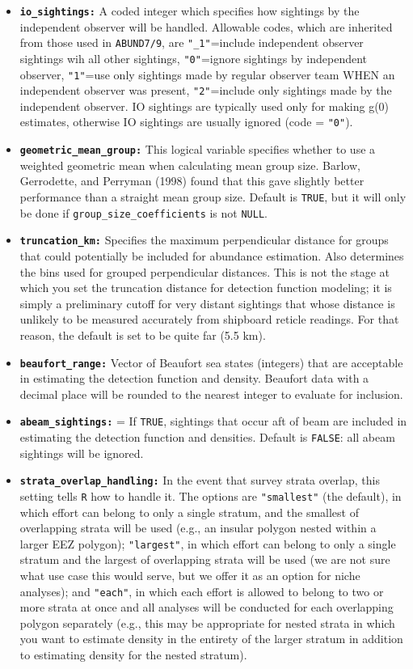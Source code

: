 \documentclass[
]{book}
\begin{document}
\begin{itemize}
\item
  \textbf{\texttt{io\_sightings:}} A coded integer which specifies how sightings by the independent observer will be handled. Allowable codes, which are inherited from those used in \texttt{ABUND7/9}, are \texttt{"\_1"}=include independent observer sightings wih all other sightings, \texttt{"0"}=ignore sightings by independent observer, \texttt{"1"}=use only sightings made by regular observer team WHEN an independent observer was present, \texttt{"2"}=include only sightings made by the independent observer. IO sightings are typically used only for making g(0) estimates, otherwise IO sightings are usually ignored (code = \texttt{"0"}).
\item
  \textbf{\texttt{geometric\_mean\_group:}} This logical variable specifies whether to use a weighted geometric mean when calculating mean group size. Barlow, Gerrodette, and Perryman (1998) found that this gave slightly better performance than a straight mean group size. Default is \texttt{TRUE}, but it will only be done if \texttt{group\_size\_coefficients} is not \texttt{NULL}.
\item
  \textbf{\texttt{truncation\_km:}} Specifies the maximum perpendicular distance for groups that could potentially be included for abundance estimation. Also determines the bins used for grouped perpendicular distances. This is not the stage at which you set the truncation distance for detection function modeling; it is simply a preliminary cutoff for very distant sightings that whose distance is unlikely to be measured accurately from shipboard reticle readings. For that reason, the default is set to be quite far (5.5 km).
\item
  \textbf{\texttt{beaufort\_range:}} Vector of Beaufort sea states (integers) that are acceptable in estimating the detection function and density. Beaufort data with a decimal place will be rounded to the nearest integer to evaluate for inclusion.
\item
  \textbf{\texttt{abeam\_sightings:}} = If \texttt{TRUE}, sightings that occur aft of beam are included in estimating the detection function and densities. Default is \texttt{FALSE}: all abeam sightings will be ignored.
\item
  \textbf{\texttt{strata\_overlap\_handling:}} In the event that survey strata overlap, this setting tells \texttt{R} how to handle it. The options are \texttt{"smallest"} (the default), in which effort can belong to only a single stratum, and the smallest of overlapping strata will be used (e.g., an insular polygon nested within a larger EEZ polygon); \texttt{"largest"}, in which effort can belong to only a single stratum and the largest of overlapping strata will be used (we are not sure what use case this would serve, but we offer it as an option for niche analyses); and \texttt{"each"}, in which each effort is allowed to belong to two or more strata at once and all analyses will be conducted for each overlapping polygon separately (e.g., this may be appropriate for nested strata in which you want to estimate density in the entirety of the larger stratum in addition to estimating density for the nested stratum).

\end{itemize}
\end{document}
